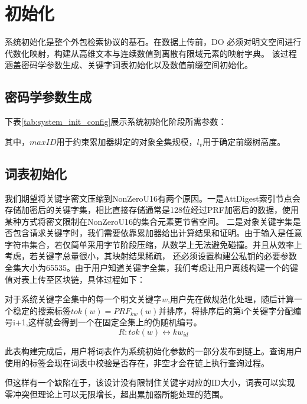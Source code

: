 \chapter{初始化}
系统初始化是整个外包检索协议的基石。在数据上传前，DO 必须对明文空间进行代数化映射，构建从高维文本与连续数值到离散有限域元素的映射字典。
该过程涵盖密码学参数生成、关键字词表初始化以及数值前缀空间初始化。
\section{密码学参数生成}
下表\ref{tab:system_init_config}展示系统初始化阶段所需参数：


其中，$maxID$用于约束累加器绑定的对象全集规模，$l_v$用于确定前缀树高度。

\section{词表初始化}
我们期望将关键字密文压缩到NonZeroU16有两个原因。一是AttDigest索引节点会存储加密后的关键字集，相比直接存储通常是128位经过PRF加密后的数据，使用某种方式将密文限制在NonZeroU16的集合元素更节省空间。
二是对象关键字集是否包含请求关键字时，我们需要依靠累加器给出计算结果和证明。由于输入是任意字符串集合，若仅简单采用字节阶段压缩，从数学上无法避免碰撞。并且从效率上考虑，若关键字总量很小，其映射结果稀疏，
还必须设置构建公私钥的必要参数全集大小为65535。由于用户知道关键字全集，我们考虑让用户离线构建一个的键值对表上传至区块链，具体过程如下：

对于系统关键字全集中的每一个明文关键字$w$,用户先在做规范化处理，随后计算一个稳定的搜索标签$tok(w)=PRF_{kw}(w)$并排序，将排序后的第i个关键字分配编号i+1,这样就会得到一个在固定全集上的伪随机编号。
\begin{equation}
    R:tok(w) \leftrightarrow kw_{id}
\end{equation}

此表构建完成后，用户将词表作为系统初始化参数的一部分发布到链上。查询用户使用的标签会现在词表中校验是否存在，非空才会在链上执行查询过程。

但这样有一个缺陷在于，该设计没有限制住关键字对应的ID大小，词表可以实现零冲突但理论上可以无限增长，超出累加器所能处理的范围。
